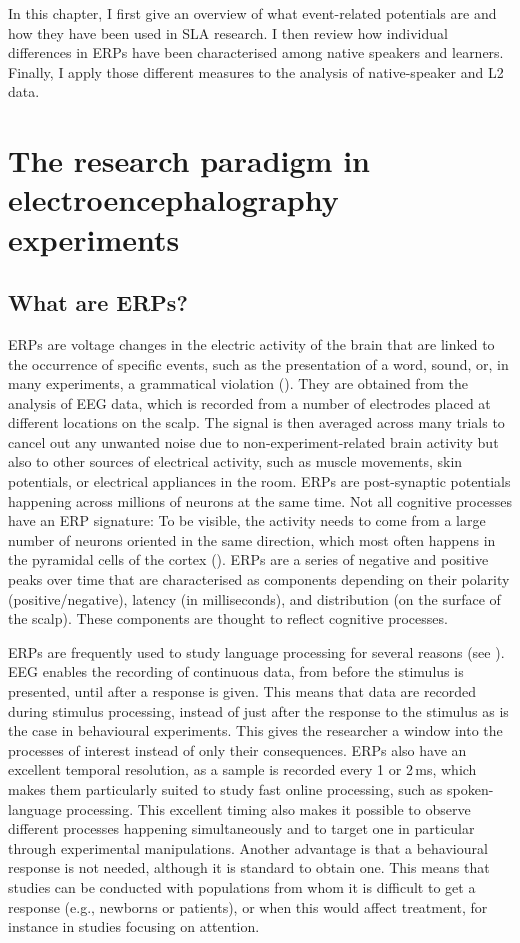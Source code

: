 \documentclass[output=paper,colorlinks,citecolor=brown,modfonts,nonflat]{../langscibook}
\begin{document}
In this chapter, I first give an overview of what event-related potentials are and how they have been used in SLA research. I then review how individual differences in ERPs have been characterised among native speakers and learners. Finally, I apply those different measures to the analysis of native-speaker and L2 data. 

\section{The research paradigm in electroencephalography experiments}

\subsection{What are ERPs?}
ERPs are voltage changes in the electric activity of the brain that are linked to the occurrence of specific events, such as the presentation of a word, sound, or, in many experiments,  a grammatical violation (\citealt{FabianiEtAl2007,HellTokowicz2010}). They are obtained from the analysis of EEG data, which is recorded from a number of electrodes placed at different locations on the scalp. The signal is then averaged across many trials to cancel out any unwanted noise due to non-experiment-related brain activity but also to other sources of electrical activity, such as muscle movements, skin potentials, or electrical appliances in the room. ERPs are post-synaptic potentials happening across millions of neurons at the same time. Not all cognitive processes have an ERP signature: To be visible, the activity needs to come from a large number of neurons oriented in the same direction, which most often happens in the pyramidal cells of the cortex (\citealt{OsterhoutEtAl2004,Luck2014}). ERPs are a series of negative and positive peaks over time that are characterised as components depending on their polarity (positive/negative), latency (in milliseconds), and distribution (on the surface of the scalp). These components are thought to reflect cognitive processes.

ERPs are frequently used to study language processing for several reasons (see \citealt{Kaan2007,Luck2014}). EEG enables the recording of continuous data, from before the stimulus is presented, until after a response is given. This means that data are recorded during stimulus processing, instead of just after the response to the stimulus as is the case in behavioural experiments. This gives the researcher a window into the processes of interest instead of only their consequences. ERPs also have an excellent temporal resolution, as a sample is recorded every 1 or 2\,ms, which makes them particularly suited to study fast online processing, such as spoken-language processing. This excellent timing also makes it possible to observe different processes happening simultaneously and to target one in particular through experimental manipulations. Another advantage is that a behavioural response is not needed, although it is standard to obtain one. This means that studies can be conducted with populations from whom it is difficult to get a response (e.g., newborns or patients), or when this would affect treatment, for instance in studies focusing on attention.
\end{document}
